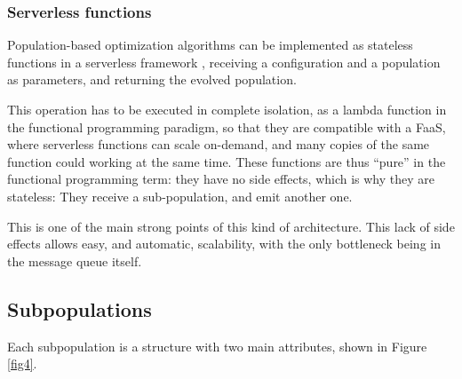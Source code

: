 \documentclass[runningheads]{llncs}
\begin{document}
\subsubsection{Serverless functions}

Population-based optimization algorithms can be implemented
as stateless functions in a serverless framework  \cite{Roberts2016},
receiving a configuration and a population as 
parameters, and returning the evolved population. %

This operation has to be
executed in complete isolation, as a lambda function in the functional
programming paradigm, so that they are compatible with a FaaS, where serverless
functions can scale on-demand, and many copies of the same function could
working at the same time. %
These functions are thus ``pure'' in the functional programming term:
they have no side effects, which is why they are stateless: They
receive a sub-population, and emit another one.

This is one of the main strong points of this kind of
architecture. This lack of side effects allows easy, and automatic,
scalability, with the only bottleneck being in the message queue
itself.

\subsection{Subpopulations}

Each subpopulation is a structure with two main attributes, shown in
Figure \ref{fig4}.
\end{document}
